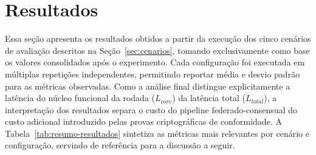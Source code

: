 \documentclass[12pt]{article}
\begin{document}
\section{Resultados}

Essa seção apresenta os resultados obtidos a partir da execução dos cinco cenários de avaliação descritos na Seção~\ref{sec:cenarios}, tomando exclusivamente como base os valores consolidados após o experimento. Cada configuração foi executada em múltiplas repetições independentes, permitindo reportar média e desvio padrão para as métricas observadas. Como a análise final distingue explicitamente a latência do núcleo funcional da rodada ($L_{core}$) da latência total ($L_{total}$), a interpretação dos resultados separa o custo do pipeline federado-consensual do custo adicional introduzido pelas provas criptográficas de conformidade. A Tabela~\ref{tab:resumo-resultados} sintetiza as métricas mais relevantes por cenário e configuração, servindo de referência para a discussão a seguir.
\end{document}
